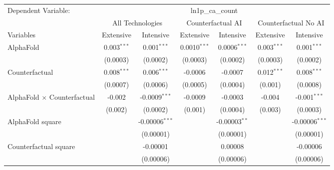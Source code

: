 \begingroup
\centering
\begin{tabular}{lcccccc}
   \tabularnewline \midrule \midrule
   Dependent Variable: & \multicolumn{6}{c}{ln1p\_ca\_count}\\
 & \multicolumn{2}{c}{All Technologies} & \multicolumn{2}{c}{Counterfactual AI} & \multicolumn{2}{c}{Counterfactual No AI} \\
\cmidrule(lr){1-1}\cmidrule(lr){2-3} \cmidrule(lr){4-5} \cmidrule(lr){6-7}
Variables & \multicolumn{1}{c}{Extensive} & \multicolumn{1}{c}{Intensive} & \multicolumn{1}{c}{Extensive} & \multicolumn{1}{c}{Intensive} & \multicolumn{1}{c}{Extensive} & \multicolumn{1}{c}{Intensive} \\
\cmidrule(lr){1-1}\cmidrule(lr){2-2} \cmidrule(lr){3-3} \cmidrule(lr){4-4} \cmidrule(lr){5-5} \cmidrule(lr){6-6} \cmidrule(lr){7-7}
   AlphaFold                          & 0.003$^{***}$ & 0.001$^{***}$    & 0.0010$^{***}$ & 0.0006$^{***}$  & 0.003$^{***}$ & 0.001$^{***}$\\   
                                      & (0.0003)      & (0.0002)         & (0.0003)       & (0.0002)        & (0.0003)      & (0.0002)\\   
   Counterfactual                     & 0.008$^{***}$ & 0.006$^{***}$    & -0.0006        & -0.0007         & 0.012$^{***}$ & 0.008$^{***}$\\   
                                      & (0.0007)      & (0.0006)         & (0.0005)       & (0.0004)        & (0.001)       & (0.0008)\\   
   AlphaFold $\times$ Counterfactual  & -0.002        & -0.0009$^{***}$  & -0.0009        & -0.0003         & -0.004        & -0.001$^{***}$\\   
                                      & (0.002)       & (0.0002)         & (0.001)        & (0.0004)        & (0.003)       & (0.0003)\\   
   AlphaFold square                   &               & -0.00006$^{***}$ &                & -0.00003$^{**}$ &               & -0.00006$^{***}$\\   
                                      &               & (0.00001)        &                & (0.00001)       &               & (0.00001)\\   
   Counterfactual square              &               & -0.00001         &                & 0.00008         &               & -0.00006\\   
                                      &               & (0.00006)        &                & (0.00006)       &               & (0.00006)\\   

\end{tabular}
